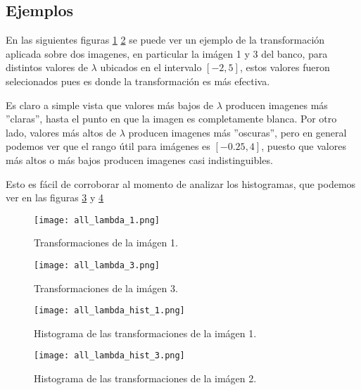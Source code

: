     \subsection{Ejemplos}
    
    En las siguientes figuras \ref{fig:all_lambda_1} \ref{fig:all_lambda_2} se puede ver un ejemplo de la transformaci\'on aplicada sobre dos imagenes, en particular la im\'agen 1 y 3 del banco, para distintos valores de $\lambda$ ubicados en el intervalo $[-2,5]$, estos valores fueron selecionados pues es donde la transformaci\'on es m\'as efectiva.

    Es claro a simple vista que valores m\'as bajos de $\lambda$ producen imagenes m\'as ''claras'', hasta el punto en que la imagen es completamente blanca. Por otro lado, valores m\'as altos de $\lambda$ producen imagenes m\'as ''oscuras'', pero en general podemos ver que el rango \'util para im\'agenes es $[-0.25,4]$, puesto que valores m\'as altos o m\'as bajos producen imagenes casi indistinguibles. 

    Esto es f\'acil de corroborar al momento de analizar los histogramas, que podemos ver en las figuras \ref{fig:img_bci_hist_1} y \ref{fig:img_bci_hist_2} 

    \begin{figure}[H]
        \centering
        \texttt{[image: all\_lambda\_1.png]}
        \caption{Transformaciones de la im\'agen 1.}
        \label{fig:all_lambda_1}
    \end{figure}

    \begin{figure}[H]
        \centering
        \texttt{[image: all\_lambda\_3.png]}
        \caption{Transformaciones de la im\'agen 3.}
        \label{fig:all_lambda_2}
    \end{figure}

    \begin{figure}[H]
        \centering
        \texttt{[image: all\_lambda\_hist\_1.png]}
        \caption{Histograma de las transformaciones de la im\'agen 1.}
        \label{fig:img_bci_hist_1}
    \end{figure}

    \begin{figure}[H]
        \centering
        \texttt{[image: all\_lambda\_hist\_3.png]}
        \caption{Histograma de las transformaciones de la im\'agen 2.}
        \label{fig:img_bci_hist_2}
    \end{figure}

